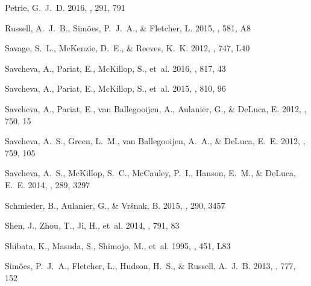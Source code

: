 \documentclass[apj]{emulateapj}
\begin{document}
\begin{thebibliography}{66}
{Petrie}, G.~J.~D. 2016, \solphys, 291, 791

{Russell}, A.~J.~B., {Sim{\~o}es}, P.~J.~A., \& {Fletcher}, L. 2015, \aap, 581,
  A8

{Savage}, S.~L., {McKenzie}, D.~E., \& {Reeves}, K.~K. 2012, \apjl, 747, L40

{Savcheva}, A., {Pariat}, E., {McKillop}, S., {et~al.} 2016, \apj, 817, 43

{Savcheva}, A., {Pariat}, E., {McKillop}, S., {et~al.} 2015, \apj, 810, 96

{Savcheva}, A., {Pariat}, E., {van Ballegooijen}, A., {Aulanier}, G., \&
  {DeLuca}, E. 2012{}, \apj, 750, 15

{Savcheva}, A.~S., {Green}, L.~M., {van Ballegooijen}, A.~A., \& {DeLuca},
  E.~E. 2012{}, \apj, 759, 105

{Savcheva}, A.~S., {McKillop}, S.~C., {McCauley}, P.~I., {Hanson}, E.~M., \&
  {DeLuca}, E.~E. 2014, \solphys, 289, 3297

{Schmieder}, B., {Aulanier}, G., \& {Vr{\v s}nak}, B. 2015, \solphys, 290, 3457

{Shen}, J., {Zhou}, T., {Ji}, H., {et~al.} 2014, \apj, 791, 83

{Shibata}, K., {Masuda}, S., {Shimojo}, M., {et~al.} 1995, \apjl, 451, L83

{Sim{\~o}es}, P.~J.~A., {Fletcher}, L., {Hudson}, H.~S., \& {Russell}, A.~J.~B.
  2013, \apj, 777, 152


\end{thebibliography}
\end{document}
